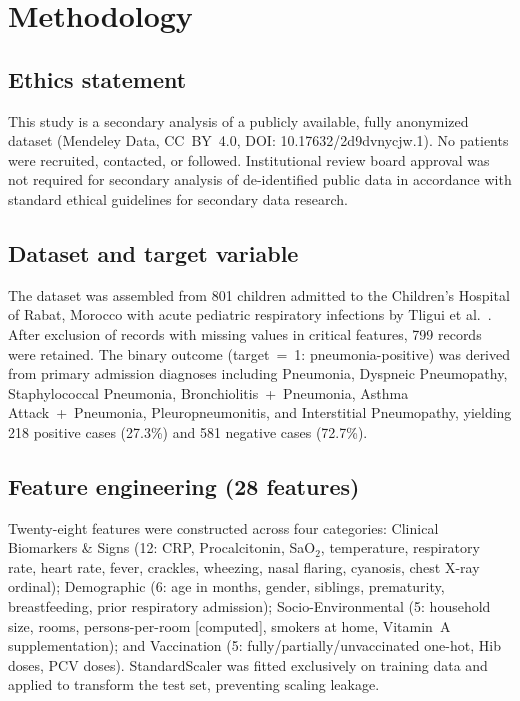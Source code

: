 \documentclass[3p,times,twocolumn]{elsarticle}
\begin{document}
\section{Methodology}

\subsection{Ethics statement}
This study is a secondary analysis of a publicly available, fully anonymized dataset (Mendeley Data, CC~BY~4.0, DOI: 10.17632/2d9dvnycjw.1). No patients were recruited, contacted, or followed. Institutional review board approval was not required for secondary analysis of de-identified public data in accordance with standard ethical guidelines for secondary data research.

\subsection{Dataset and target variable}
The dataset was assembled from 801 children admitted to the Children's Hospital of Rabat, Morocco with acute pediatric respiratory infections by Tligui et al.\ \cite{ref15}. After exclusion of records with missing values in critical features, 799 records were retained. The binary outcome (target~=~1: pneumonia-positive) was derived from primary admission diagnoses including Pneumonia, Dyspneic Pneumopathy, Staphylococcal Pneumonia, Bronchiolitis~+~Pneumonia, Asthma Attack~+~Pneumonia, Pleuropneumonitis, and Interstitial Pneumopathy, yielding 218 positive cases (27.3\%) and 581 negative cases (72.7\%).

\subsection{Feature engineering (28 features)}
Twenty-eight features were constructed across four categories: Clinical Biomarkers \& Signs (12: CRP, Procalcitonin, SaO$_2$, temperature, respiratory rate, heart rate, fever, crackles, wheezing, nasal flaring, cyanosis, chest X-ray ordinal); Demographic (6: age in months, gender, siblings, prematurity, breastfeeding, prior respiratory admission); Socio-Environmental (5: household size, rooms, persons-per-room [computed], smokers at home, Vitamin~A supplementation); and Vaccination (5: fully/partially/unvaccinated one-hot, Hib doses, PCV doses). StandardScaler was fitted exclusively on training data and applied to transform the test set, preventing scaling leakage.
\end{document}
